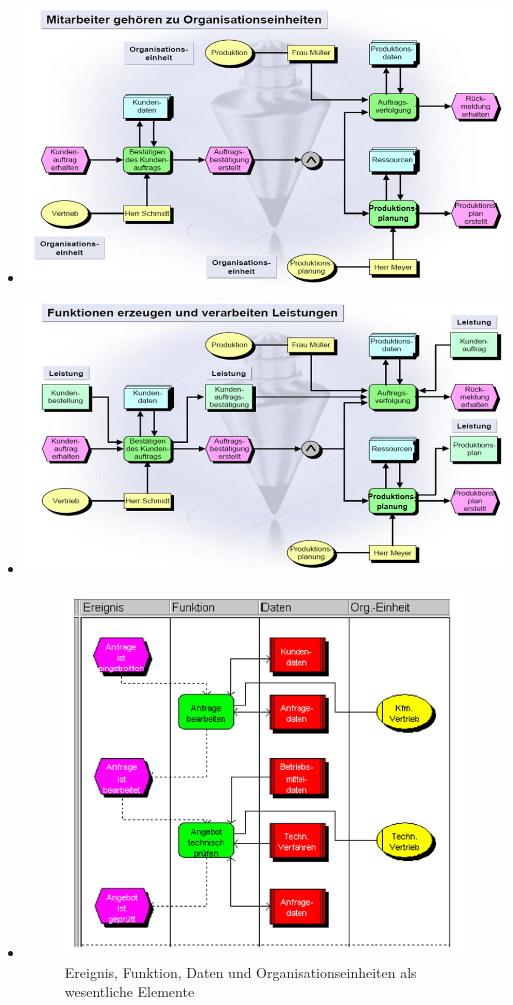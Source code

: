 \documentclass[11pt,a4paper]{article}
\begin{document}
\begin{itemize}
\begin{itemize}
		\item[] \includegraphics[width=15cm]{eepk4}
		\item[] \includegraphics[width=15cm]{eepk5}
		
		\item[] 
			\begin{figure}[H]
			\centering
			\includegraphics[width=15cm]{eepk6}
			\caption{Ereignis, Funktion, Daten und Organisationseinheiten als wesentliche Elemente}
			\end{figure}
		\end{itemize}
	

\end{itemize}
\end{document}
